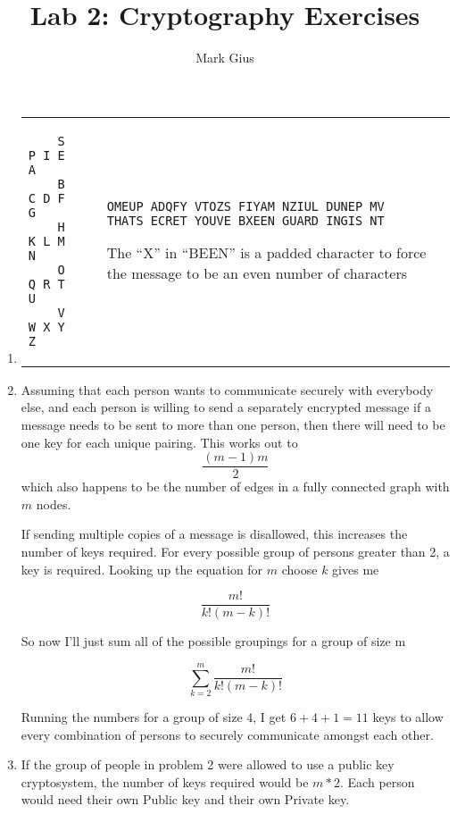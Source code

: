 \documentclass[11pt]{article}
\begin{document}
\author{Mark Gius}
\title{Lab 2: Cryptography Exercises}
\maketitle

\begin{enumerate}

\item %
\begin{tabular}{p{3cm} p{1cm} p{8cm}}
\begin{verbatim}
    S P I E A
    B C D F G
    H K L M N
    O Q R T U
    V W X Y Z
\end{verbatim} & &
\begin{verbatim}
OMEUP ADQFY VTOZS FIYAM NZIUL DUNEP MV
THATS ECRET YOUVE BXEEN GUARD INGIS NT
\end{verbatim}
The ``X'' in ``BEEN'' is a padded character to force the message to be an 
even number of characters
\end{tabular}

\item %
Assuming that each person wants to communicate securely with everybody else,
and each person is willing to send a separately encrypted message if a message
needs to be sent to more than one person, then there will need to be one key
for each unique pairing.  This works out to 
\[\frac{(m-1) m}{2}\]
which also happens to be the number of edges in a fully connected graph 
with $m$ nodes.

If sending multiple copies of a message is disallowed, this increases the
number of keys required.  For every possible group of persons greater than 2,
a key is required.  Looking up the equation for $m$ choose $k$ gives me

\[\frac{m!}{k!(m-k)!}\]

So now I'll just sum all of the possible groupings for a group of size m

\[
\sum_{k=2}^{m} \frac{m!}{k!(m-k)!}
\]

Running the numbers for a group of size 4, I get $6 + 4 + 1 = 11$ keys to 
allow every combination of persons to securely communicate amongst each other.

\item %

If the group of people in problem 2 were allowed to use a public key 
cryptosystem, the number of keys required would be $m * 2$. Each person would
need their own Public key and their own Private key.


\end{enumerate}
\end{document}
